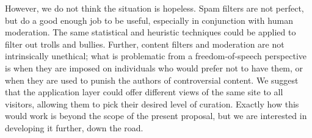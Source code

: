 \documentclass[oneside]{zarticle}
\begin{document}
However, we do not think the situation is hopeless.  Spam filters are
not perfect, but do a good enough job to be useful, especially in
conjunction with human moderation.  The same statistical and heuristic
techniques could be applied to filter out trolls and bullies.
Further, content filters and moderation are not intrinsically
unethical; what is problematic from a freedom-of-speech perspective is
when they are imposed on individuals who would prefer not to have
them, or when they are used to punish the authors of controversial
content.  We suggest that the application layer could offer different
views of the same site to all visitors, allowing them to pick their
desired level of curation.  Exactly how this would work is beyond the
scope of the present proposal, but we are interested in developing it
further, down the road.

\printbibliography
\end{document}
